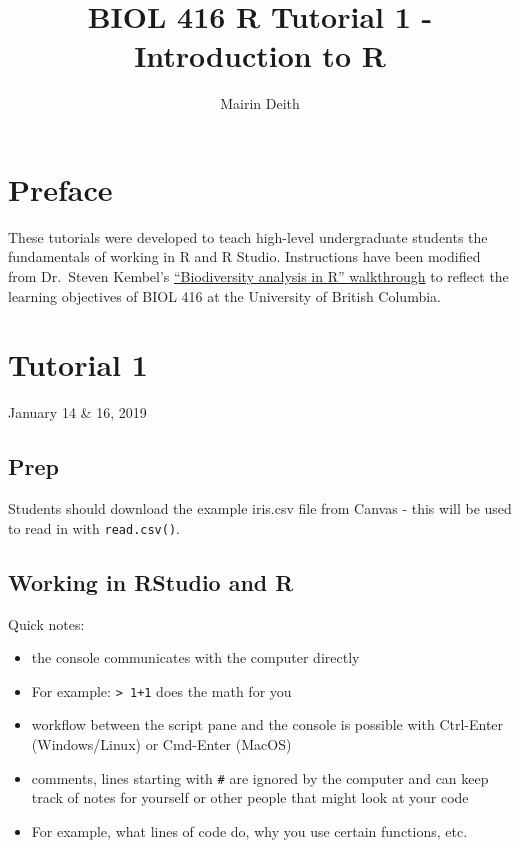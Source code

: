 \documentclass[]{article}
\title{BIOL 416 R Tutorial 1 - Introduction to R}
\author{Mairin Deith}
\date{}
\providecommand{\tightlist}{%
  \setlength{\itemsep}{0pt}\setlength{\parskip}{0pt}}
\begin{document}
\maketitle

\section{Preface}\label{preface}

These tutorials were developed to teach high-level undergraduate
students the fundamentals of working in R and R Studio. Instructions
have been modified from Dr.~Steven Kembel's
\href{http://kembellab.ca/r-workshop/biodivR/SK_Biodiversity_R.html}{``Biodiversity
analysis in R'' walkthrough} to reflect the learning objectives of BIOL
416 at the University of British Columbia.

\section{Tutorial 1}\label{tutorial-1}

January 14 \& 16, 2019

\subsection{Prep}\label{prep}

Students should download the example iris.csv file from Canvas - this
will be used to read in with \texttt{read.csv()}.

\subsection{Working in RStudio and R}\label{working-in-rstudio-and-r}

Quick notes:

\begin{itemize}
\tightlist
\item
  the console communicates with the computer directly
\item
  For example: \texttt{\textgreater{}\ 1+1} does the math for you
\item
  workflow between the script pane and the console is possible with
  Ctrl-Enter (Windows/Linux) or Cmd-Enter (MacOS)
\item
  comments, lines starting with \texttt{\#} are ignored by the computer
  and can keep track of notes for yourself or other people that might
  look at your code
\item
  For example, what lines of code do, why you use certain functions,
  etc.
\end{itemize}
\end{document}
